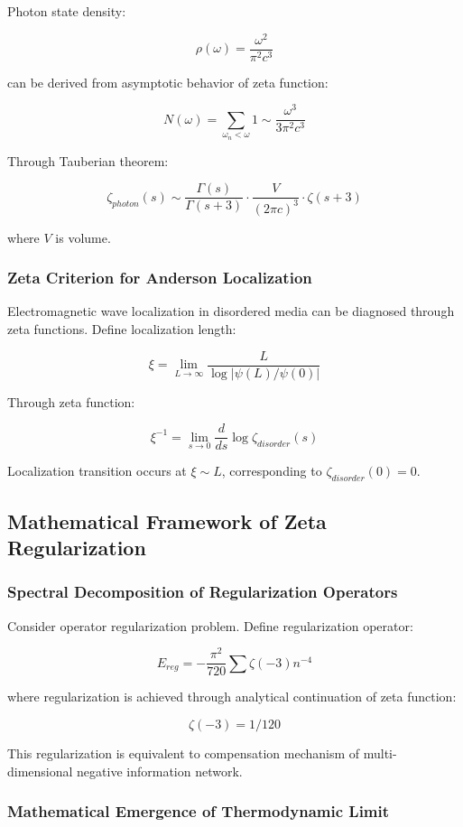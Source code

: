 \documentclass[12pt,a4paper]{article}
\begin{document}
Photon state density:

$$\rho(\omega) = \frac{\omega^2}{\pi^2 c^3}$$

can be derived from asymptotic behavior of zeta function:

$$N(\omega) = \sum_{\omega_n < \omega} 1 \sim \frac{\omega^3}{3\pi^2 c^3}$$

Through Tauberian theorem:

$$\zeta_{photon}(s) \sim \frac{\Gamma(s)}{\Gamma(s+3)} \cdot \frac{V}{(2\pi c)^3} \cdot \zeta(s+3)$$

where $V$ is volume.

\subsubsection{Zeta Criterion for Anderson Localization}

Electromagnetic wave localization in disordered media can be diagnosed through zeta functions. Define localization length:

$$\xi = \lim_{L \to \infty} \frac{L}{\log|\psi(L)/\psi(0)|}$$

Through zeta function:

$$\xi^{-1} = \lim_{s \to 0} \frac{d}{ds} \log \zeta_{disorder}(s)$$

Localization transition occurs at $\xi \sim L$, corresponding to $\zeta_{disorder}(0) = 0$.

\subsection{Mathematical Framework of Zeta Regularization}

\subsubsection{Spectral Decomposition of Regularization Operators}

Consider operator regularization problem. Define regularization operator:

$$E_{reg} = - \frac{\pi^2}{720} \sum \zeta(-3) n^{-4}$$

where regularization is achieved through analytical continuation of zeta function:

$$\zeta(-3) = 1/120$$

This regularization is equivalent to compensation mechanism of multi-dimensional negative information network.

\subsubsection{Mathematical Emergence of Thermodynamic Limit}
\end{document}
